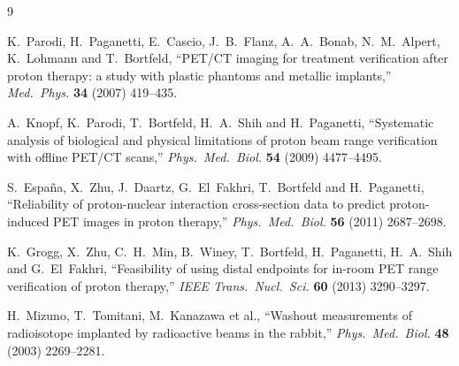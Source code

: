\documentclass[11pt]{article}
\begin{document}
\begin{thebibliography}{9}

K.~Parodi, H.~Paganetti, E.~Cascio, J.~B.~Flanz, A.~A.~Bonab, N.~M.~Alpert,
K.~Lohmann and T.~Bortfeld,
``PET/CT imaging for treatment verification after proton therapy: a study with
plastic phantoms and metallic implants,''
\textit{Med.\ Phys.} \textbf{34} (2007) 419--435.

A.~Knopf, K.~Parodi, T.~Bortfeld, H.~A.~Shih and H.~Paganetti,
``Systematic analysis of biological and physical limitations of proton beam
range verification with offline PET/CT scans,''
\textit{Phys.\ Med.\ Biol.} \textbf{54} (2009) 4477--4495.

S.~Espa\~na, X.~Zhu, J.~Daartz, G.~El~Fakhri, T.~Bortfeld and H.~Paganetti,
``Reliability of proton-nuclear interaction cross-section data to predict
proton-induced PET images in proton therapy,''
\textit{Phys.\ Med.\ Biol.} \textbf{56} (2011) 2687--2698.

K.~Grogg, X.~Zhu, C.~H.~Min, B.~Winey, T.~Bortfeld, H.~Paganetti, H.~A.~Shih and
G.~El~Fakhri,
``Feasibility of using distal endpoints for in-room PET range verification of
proton therapy,''
\textit{IEEE Trans.\ Nucl.\ Sci.} \textbf{60} (2013) 3290--3297.

H.~Mizuno, T.~Tomitani, M.~Kanazawa et al.,
``Washout measurements of radioisotope implanted by radioactive beams in the
rabbit,''
\textit{Phys.\ Med.\ Biol.} \textbf{48} (2003) 2269--2281.

\end{thebibliography}
\end{document}
